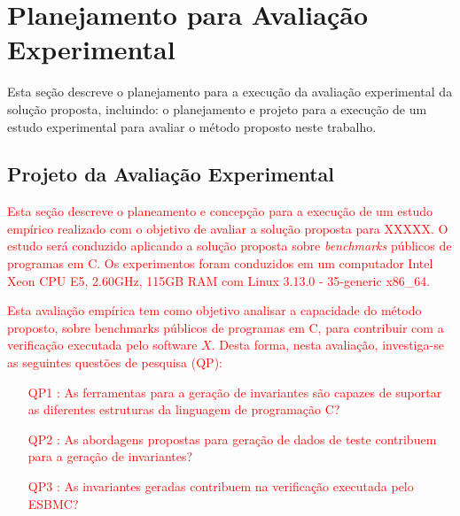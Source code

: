 \section{Planejamento para Avaliação Experimental}
\label{sec:plan-experimentos}


Esta seção descreve o planejamento para a execução da avaliação experimental da solução proposta, incluindo: o planejamento e projeto para a execução de um estudo experimental para avaliar o método proposto 
neste trabalho.


\subsection{Projeto da Avaliação Experimental}
\label{sub:experimento}


\textcolor{red}{Esta seção descreve o planeamento e concepção para a execução de um estudo empírico realizado com o objetivo de avaliar a solução proposta para \textcolor{red}{XXXXX}. O estudo será conduzido aplicando a solução proposta sobre \textit{benchmarks} públicos de programas em C. Os experimentos foram conduzidos em um computador Intel Xeon CPU E5, 2.60GHz, 115GB RAM com Linux 3.13.0 - 35-generic x86\_64.}


\textcolor{red}{Esta avaliação empírica tem como objetivo analisar a capacidade do método proposto, sobre benchmarks públicos de programas em C, para contribuir com a verificação executada pelo software $X$. Desta forma, nesta avaliação, investiga-se as seguintes questões de pesquisa (QP):
%
\begin{itemize}
    \item[QP1]: As ferramentas para a geração de invariantes são capazes de suportar as diferentes estruturas da linguagem de programação C?
    \item[QP2]: As abordagens propostas para geração de dados de teste contribuem para a geração de invariantes?
    \item[QP3]: As invariantes geradas contribuem na verificação executada pelo ESBMC?
\end{itemize}}


